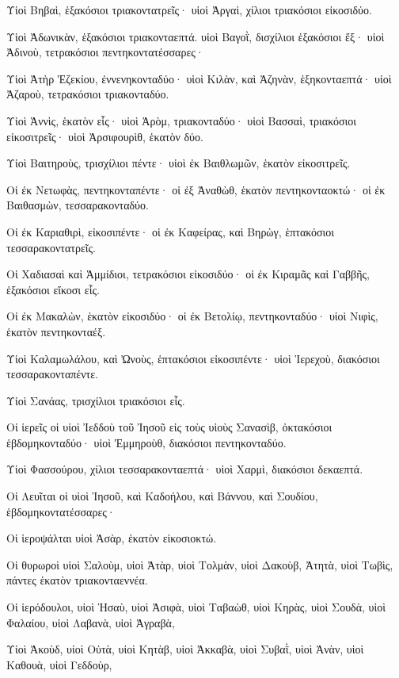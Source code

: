 {\par }{\PP {}Υἱοὶ Βηβαὶ, ἑξακόσιοι τριακοντατρεῖς· υἱοὶ Ἀργαὶ, χίλιοι τριακόσιοι εἰκοσιδύο.
\par }{\PP {}Υἱοὶ Ἀδωνικὰν, ἑξακόσιοι τριακονταεπτά. υἱοὶ Βαγοῒ, δισχίλιοι ἑξακόσιοι ἕξ· υἱοὶ Ἀδινοὺ, τετρακόσιοι πεντηκοντατέσσαρες·
\par }{\PP {}Υἱοὶ Ἀτὴρ Ἐζεκίου, ἐννενηκονταδύο· υἱοὶ Κιλὰν, καὶ Ἀζηνὰν, ἑξηκονταεπτά· υἱοὶ Ἀζαροὺ, τετρακόσιοι τριακονταδύο.
\par }{\PP {}Υἱοὶ Ἁννὶς, ἑκατὸν εἷς· υἱοὶ Ἀρὸμ, τριακονταδύο· υἱοὶ Βασσαὶ, τριακόσιοι εἰκοσιτρεῖς· υἱοὶ Ἀρσιφουρὶθ, ἑκατὸν δύο.
\par }{\PP {}Υἱοὶ Βαιτηροὺς, τρισχίλιοι πέντε· υἱοὶ ἐκ Βαιθλωμῶν, ἑκατὸν εἰκοσιτρεῖς.
\par }{\PP {}Οἱ ἐκ Νετωφὰς, πεντηκονταπέντε· οἱ ἐξ Ἀναθὼθ, ἑκατὸν πεντηκονταοκτώ· οἱ ἐκ Βαιθασμὼν, τεσσαρακονταδύο.
\par }{\PP {}Οἱ ἐκ Καριαθιρὶ, εἰκοσιπέντε· οἱ ἐκ Καφείρας, καὶ Βηρὼγ, ἑπτακόσιοι τεσσαρακοντατρεῖς.
\par }{\PP {}Οἱ Χαδιασαὶ καὶ Ἁμμίδιοι, τετρακόσιοι εἰκοσιδύο· οἱ ἐκ Κιραμᾶς καὶ Γαββῆς, ἑξακόσιοι εἴκοσι εἷς.
\par }{\PP {}Οἱ ἐκ Μακαλὼν, ἑκατὸν εἰκοσιδύο· οἱ ἐκ Βετολίῳ, πεντηκονταδύο· υἱοὶ Νιφὶς, ἑκατὸν πεντηκονταέξ.
\par }{\PP {}Υἱοὶ Καλαμωλάλου, καὶ Ὠνοὺς, ἑπτακόσιοι εἰκοσιπέντε· υἱοὶ Ἱερεχοὺ, διακόσιοι τεσσαρακονταπέντε.
\par }{\PP {}Υἱοὶ Σανάας, τρισχίλιοι τριακόσιοι εἷς.
\par }{\PP {}Οἱ ἱερεῖς οἱ υἱοὶ Ἰεδδοὺ τοῦ Ἰησοῦ εἰς τοὺς υἱοὺς Σανασὶβ, ὀκτακόσιοι ἑβδομηκονταδύο· υἱοὶ Ἐμμηροὺθ, διακόσιοι πεντηκονταδύο.
\par }{\PP {}Υἱοὶ Φασσούρου, χίλιοι τεσσαρακονταεπτά· υἱοὶ Χαρμὶ, διακόσιοι δεκαεπτά.
\par }{\PP {}Οἱ Λευῖται οἱ υἱοὶ Ἰησοῦ, καὶ Καδοήλου, καὶ Βάννου, καὶ Σουδίου, ἑβδομηκοντατέσσαρες·
\par }{\PP {}Οἱ ἱεροψάλται υἱοὶ Ἀσὰρ, ἑκατὸν εἰκοσιοκτώ.
\par }{\PP {}Οἱ θυρωροὶ υἱοὶ Σαλοὺμ, υἱοὶ Ἀτὰρ, υἱοὶ Τολμὰν, υἱοὶ Δακοὺβ, Ἀτητὰ, υἱοὶ Τωβὶς, πάντες ἑκατὸν τριακονταεννέα.
\par }{\PP {}Οἱ ἱερόδουλοι, υἱοὶ Ἡσαὺ, υἱοὶ Ἀσιφὰ, υἱοὶ Ταβαὼθ, υἱοὶ Κηρὰς, υἱοὶ Σουδὰ, υἱοὶ Φαλαίου, υἱοὶ Λαβανὰ, υἱοὶ Ἀγραβὰ,
\par }{\PP {}Υἱοὶ Ἀκοὺδ, υἱοὶ Οὐτὰ, υἱοὶ Κητὰβ, υἱοὶ Ἀκκαβὰ, υἱοὶ Συβαῒ, υἱοὶ Ἀνὰν, υἱοὶ Καθουὰ, υἱοὶ Γεδδοὺρ,
}
